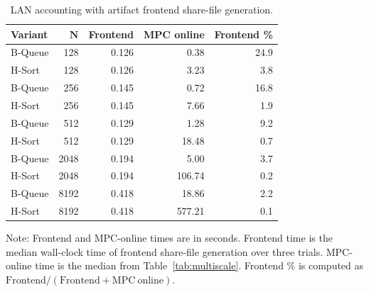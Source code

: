 \documentclass[conference,compsoc,letterpaper]{IEEEtran}
\theoremstyle{definition}
\theoremstyle{remark}
\newcommand{\HSort}{H-Sort}
\newcommand{\BQueue}{B-Queue}
\begin{document}
\begin{table}[!ht]
\centering
\small
\caption{LAN accounting with artifact frontend share-file generation.}
\label{tab:e2e_lan}
\begin{tabular}{@{}lrrrr@{}}
\toprule
\textbf{Variant} & $\mathbf{N}$ & \textbf{Frontend} & \textbf{MPC online} & \textbf{Frontend \%} \\
\midrule
\BQueue{} & 128  & 0.126 & 0.38  & 24.9 \\
\HSort{}  & 128  & 0.126 & 3.23  & 3.8  \\
\BQueue{} & 256  & 0.145 & 0.72  & 16.8 \\
\HSort{}  & 256  & 0.145 & 7.66  & 1.9  \\
\BQueue{} & 512  & 0.129 & 1.28  & 9.2  \\
\HSort{}  & 512  & 0.129 & 18.48 & 0.7  \\
\BQueue{} & 2048 & 0.194 & 5.00  & 3.7  \\
\HSort{}  & 2048 & 0.194 & 106.74 & 0.2 \\
\BQueue{} & 8192 & 0.418 & 18.86 & 2.2 \\
\HSort{}  & 8192 & 0.418 & 577.21 & 0.1 \\
\bottomrule
\end{tabular}

\smallskip
\footnotesize

\parbox{\linewidth}{
{Note:} Frontend and MPC-online times are in seconds.
Frontend time is the median wall-clock time of frontend share-file generation over three trials.
MPC-online time is the median from Table~\ref{tab:multiscale}.
Frontend \% is computed as $\mathrm{Frontend}/(\mathrm{Frontend}+\mathrm{MPC\ online})$.}
\vspace{-2mm}

\end{table}
\end{document}
